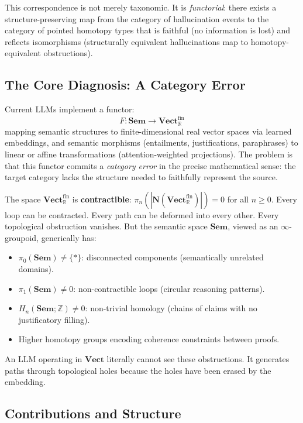 \documentclass[11pt,a4paper]{article}
\theoremstyle{plain}
\theoremstyle{definition}
\newcommand{\Sem}{\mathbf{Sem}}
\newcommand{\Vect}{\mathbf{Vect}}
\begin{document}
This correspondence is not merely taxonomic. It is \emph{functorial}: there exists a structure-preserving map from the category of hallucination events to the category of pointed homotopy types that is faithful (no information is lost) and reflects isomorphisms (structurally equivalent hallucinations map to homotopy-equivalent obstructions).

\subsection{The Core Diagnosis: A Category Error}

Current LLMs implement a functor:
\begin{equation}\label{eq:statfunctor}
  F\colon \Sem \to \Vect_{\mathbb{R}}^{\mathrm{fin}}
\end{equation}
mapping semantic structures to finite-dimensional real vector spaces via learned embeddings, and semantic morphisms (entailments, justifications, paraphrases) to linear or affine transformations (attention-weighted projections). The problem is that this functor commits a \emph{category error} in the precise mathematical sense: the target category lacks the structure needed to faithfully represent the source.

The space $\Vect_{\mathbb{R}}^{\mathrm{fin}}$ is \textbf{contractible}: $\pi_n(|\mathbf{N}(\Vect_{\mathbb{R}}^{\mathrm{fin}})|) = 0$ for all $n \geq 0$. Every loop can be contracted. Every path can be deformed into every other. Every topological obstruction vanishes. But the semantic space $\Sem$, viewed as an $\infty$-groupoid, generically has:
\begin{itemize}[nosep]
  \item $\pi_0(\Sem) \neq \{*\}$: disconnected components (semantically unrelated domains).
  \item $\pi_1(\Sem) \neq 0$: non-contractible loops (circular reasoning patterns).
  \item $H_n(\Sem;\mathbb{Z}) \neq 0$: non-trivial homology (chains of claims with no justificatory filling).
  \item Higher homotopy groups encoding coherence constraints between proofs.
\end{itemize}

An LLM operating in $\Vect$ literally cannot see these obstructions. It generates paths through topological holes because the holes have been erased by the embedding.

\subsection{Contributions and Structure}
\end{document}

